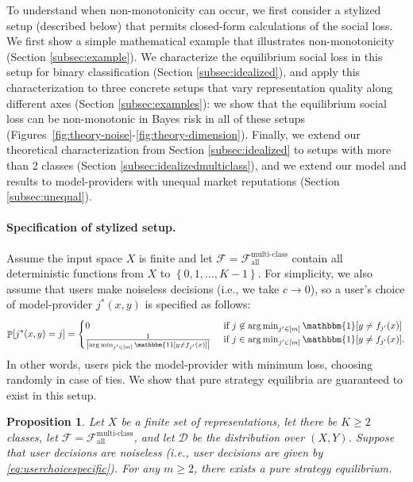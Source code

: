 \documentclass[letterpaper,11pt]{article}
\newtheorem{proposition}{Proposition}
\theoremstyle{plain}
\DeclareMathOperator*{\argmin}{arg\,min}
\DeclareMathOperator*{\Prob}{\mathbb{P}}
\begin{document}
To understand when non-monotonicity can occur, we first consider a stylized setup (described below) that permits closed-form calculations of the social loss. We first show a simple mathematical example that illustrates non-monotonicity (Section \ref{subsec:example}). We characterize the equilibrium social loss in this setup for binary classification (Section \ref{subsec:idealized}), and apply this characterization to three concrete setups that vary representation quality along different axes (Section \ref{subsec:examples}): we show that the equilibrium social loss can be non-monotonic in Bayes risk in all of these setups (Figures~\ref{fig:theory-noise}-\ref{fig:theory-dimension}). Finally, we extend our theoretical characterization from Section \ref{subsec:idealized} to setups with more than 2 classes (Section \ref{subsec:idealizedmulticlass}), and we extend our model and results to model-providers with unequal market reputations (Section \ref{subsec:unequal}).

\paragraph{Specification of stylized setup.} Assume the input space $X$ is finite and let $\mathcal{F} = \mathcal{F}^{\text{multi-class}}_{\text{all}}$ contain {all deterministic functions} from $X$ to $\left\{0,1, \ldots, K-1\right\}$. For simplicity, we also assume that users make noiseless decisions (i.e., we take $c \rightarrow 0$), so a user's choice of model-provider $j^*(x,y)$ is specified as follows: 
\begin{equation}
    \label{eq:userchoicespecific}
    \Prob[j^*(x,y) = j] = 
\begin{cases}
0 & \text{ if } j \not\in \argmin_{j' \in [m]} \mathbbm{1}[y \neq f_{j'}(x)] \\
\frac{1}{\left|\argmin_{j' \in [m]} \mathbbm{1}[y \neq f_{j'}(x)] \right|}
& \text{ if } j \in \argmin_{j' \in [m]} \mathbbm{1}[y \neq f_{j'}(x)].
\end{cases}
\end{equation}
In other words, users pick the model-provider with minimum loss, choosing randomly in case of ties. We show that pure strategy equilibria are guaranteed to exist in this setup. 
\begin{proposition}
\label{prop:existence}
Let $X$ be a finite set of representations, let there be $K \ge 2$ classes, let $\mathcal{F} = \mathcal{F}^{\text{multi-class}}_{\text{all}}$, and let $\mathcal{D}$ be the distribution over $(X,Y)$. Suppose that user decisions are noiseless (i.e., user decisions are given by \eqref{eq:userchoicespecific}). For any $m \ge 2$, there exists a pure strategy equilibrium. 
\end{proposition}
\end{document}
